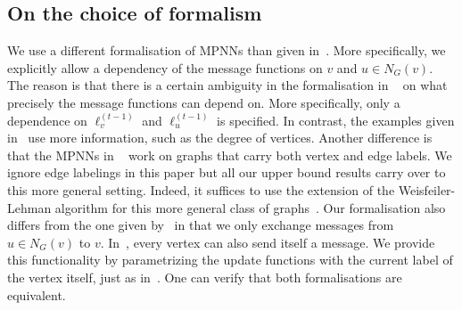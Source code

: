 \subsection{On the choice of formalism}
We use a different formalisation of MPNNs than given in~\cite{GilmerSRVD17}. More specifically, we explicitly allow a dependency of the message functions on $v$ and $u\in N_G(v)$. The reason is that there is a certain ambiguity in the formalisation in ~\cite{GilmerSRVD17} on what precisely the message functions can depend on. More specifically, only a dependence on  $\pmb{\ell}_v^{(t-1)}$ and $\pmb{\ell}_u^{(t-1)}$
is specified. In contrast, the examples given in~\cite{GilmerSRVD17} use more information, such as the degree of vertices. Another difference is that the MPNNs in ~\cite{GilmerSRVD17} work on graphs that carry both vertex and edge labels. We ignore edge labelings in this paper but all our upper bound results carry over to this more general setting. Indeed, it suffices to use the extension of the Weisfeiler-Lehman algorithm for this more general class of graphs~\cite{Jaume2019}. Our formalisation also differs from the one given by~\cite{Loukas2019} in that we only exchange messages from $u\in N_G(v)$
to $v$. In~\cite{Loukas2019}, every vertex can also send itself a message. We provide this functionality by parametrizing the update functions with the current label of the vertex itself, just as in~\cite{GilmerSRVD17}. One can verify that both formalisations are equivalent.

